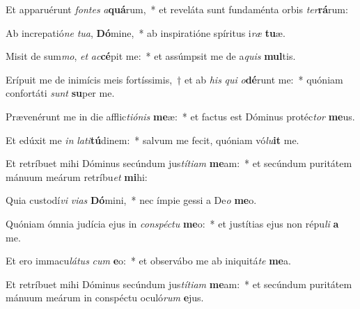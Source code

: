\item Et apparuérunt \textit{fon}\textit{tes} \textit{a}\textbf{quá}rum,~* et reveláta sunt fundaménta orbis \textit{ter}\textbf{rá}rum:
\item Ab increpatió\textit{ne} \textit{tu}\textit{a}, \textbf{Dó}mine,~* ab inspiratióne spíritus i\textit{ræ} \textbf{tu}æ.
\item Misit de sum\textit{mo}, \textit{et} \textit{ac}\textbf{cé}pit me:~* et assúmpsit me de a\textit{quis} \textbf{mul}tis.
\item Erípuit me de inimícis meis fortíssimis,~† et ab \textit{his} \textit{qui} \textit{o}\textbf{dé}runt me:~* quóniam confortáti \textit{sunt} \textbf{su}per me.
\item Prævenérunt me in die afflic\textit{ti}\textit{ó}\textit{nis} \textbf{me}æ:~* et factus est Dóminus protéc\textit{tor} \textbf{me}us.
\item Et edúxit me \textit{in} \textit{la}\textit{ti}\textbf{tú}dinem:~* salvum me fecit, quóniam vó\textit{lu}\textbf{it} me.
\item Et retríbuet mihi Dóminus secúndum jus\textit{tí}\textit{ti}\textit{am} \textbf{me}am:~* et secúndum puritátem mánuum meárum retríbu\textit{et} \textbf{mi}hi:
\item Quia custodí\textit{vi} \textit{vi}\textit{as} \textbf{Dó}mini,~* nec ímpie gessi a De\textit{o} \textbf{me}o.
\item Quóniam ómnia judícia ejus in \textit{con}\textit{spéc}\textit{tu} \textbf{me}o:~* et justítias ejus non répu\textit{li} \textbf{a} me.
\item Et ero immacu\textit{lá}\textit{tus} \textit{cum} \textbf{e}o:~* et observábo me ab iniquitá\textit{te} \textbf{me}a.
\item Et retríbuet mihi Dóminus secúndum jus\textit{tí}\textit{ti}\textit{am} \textbf{me}am:~* et secúndum puritátem mánuum meárum in conspéctu oculó\textit{rum} \textbf{e}jus.

